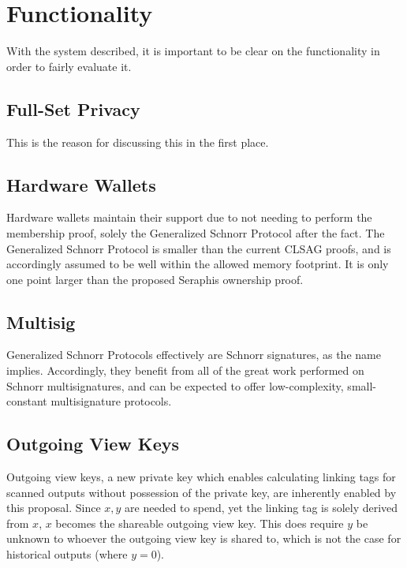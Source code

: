 \documentclass[]{article}
\begin{document}
\newpage

\section{Functionality}

With the system described, it is important to be clear on the functionality in order to fairly evaluate it.

\subsection{Full-Set Privacy}

This is the reason for discussing this in the first place.

\subsection{Hardware Wallets}

Hardware wallets maintain their support due to not needing to perform the membership proof, solely the Generalized Schnorr Protocol after the fact. The Generalized Schnorr Protocol is smaller than the current CLSAG proofs, and is accordingly assumed to be well within the allowed memory footprint. It is only one point larger than the proposed Seraphis ownership proof.

\subsection{Multisig}

Generalized Schnorr Protocols effectively are Schnorr signatures, as the name implies. Accordingly, they benefit from all of the great work performed on Schnorr multisignatures, and can be expected to offer low-complexity, small-constant multisignature protocols.

\subsection{Outgoing View Keys}

Outgoing view keys, a new private key which enables calculating linking tags for scanned outputs without possession of the private key, are inherently enabled by this proposal. Since $x, y$ are needed to spend, yet the linking tag is solely derived from $x$, $x$ becomes the shareable outgoing view key. This does require $y$ be unknown to whoever the outgoing view key is shared to, which is not the case for historical outputs (where $y = 0$).
\end{document}
